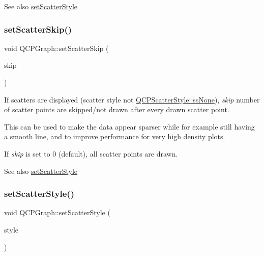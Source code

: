 \begin{DoxySeeAlso}{See also}
\hyperlink{classQCPGraph_a12bd17a8ba21983163ec5d8f42a9fea5}{set\+Scatter\+Style} 
\end{DoxySeeAlso}
\mbox{\label{classQCPGraph_a17cebd3196f434258abb82ba6dc443f2}} 
\subsubsection{\texorpdfstring{set\+Scatter\+Skip()}{setScatterSkip()}}
{\footnotesize\ttfamily void Q\+C\+P\+Graph\+::set\+Scatter\+Skip (\begin{DoxyParamCaption}\item[{int}]{skip }\end{DoxyParamCaption})}

If scatters are displayed (scatter style not \hyperlink{classQCPScatterStyle_adb31525af6b680e6f1b7472e43859349abd144c291ca274f77053ec68cab6c022}{Q\+C\+P\+Scatter\+Style\+::ss\+None}), {\itshape skip} number of scatter points are skipped/not drawn after every drawn scatter point.

This can be used to make the data appear sparser while for example still having a smooth line, and to improve performance for very high density plots.

If {\itshape skip} is set to 0 (default), all scatter points are drawn.

\begin{DoxySeeAlso}{See also}
\hyperlink{classQCPGraph_a12bd17a8ba21983163ec5d8f42a9fea5}{set\+Scatter\+Style} 
\end{DoxySeeAlso}
\mbox{\label{classQCPGraph_a12bd17a8ba21983163ec5d8f42a9fea5}} 
\subsubsection{\texorpdfstring{set\+Scatter\+Style()}{setScatterStyle()}}
{\footnotesize\ttfamily void Q\+C\+P\+Graph\+::set\+Scatter\+Style (\begin{DoxyParamCaption}\item[{const \hyperlink{classQCPScatterStyle}{Q\+C\+P\+Scatter\+Style} \&}]{style }\end{DoxyParamCaption})}

